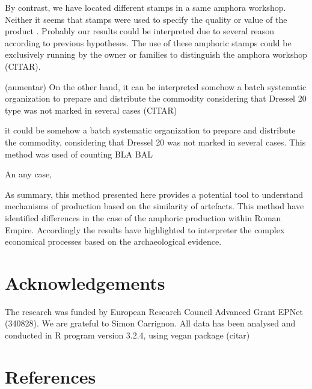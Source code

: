 \documentclass[review]{elsarticle}
\begin{document}
By contrast, we have located different stamps in a same amphora workshop. Neither it seems that stamps were used to specify the quality or value of the product \citep{callender}. Probably our results could be interpreted due to several reason according to previous hypotheses. The use of these amphoric stamps could be exclusively running by the owner or families to distinguish the amphora workshop (CITAR). 

(aumentar)
On the other hand, it can be interpreted somehow a batch systematic organization to prepare and distribute the commodity considering that Dressel 20 type was not marked in several cases (CITAR)


it could be somehow a batch systematic organization to prepare and distribute the commodity, considering that Dressel 20 was not marked in several cases. This method was used of counting BLA BAL 

 

An any case, 

As summary, this method presented here provides a potential tool to understand mechanisms of production based on the similarity of artefacts. This method have identified differences in the case of the amphoric production within Roman Empire. Accordingly the results have highlighted to interpreter the complex economical processes based on  the archaeological evidence. 



\section{Acknowledgements}

The research was funded by European Research Council Advanced Grant EPNet (340828). We are grateful to Simon Carrignon. 
All data has been analysed and conducted in R program version 3.2.4, using vegan package (citar) 


\section{References}


\end{document}
